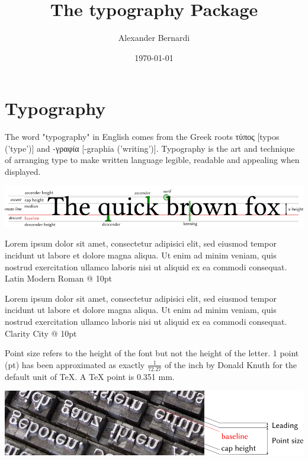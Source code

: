 \documentclass[a4paper,10pt]{scrarticle}
\title{\textnormal{The \textbf{typography} Package}}
\author{Alexander Bernardi}
\date{\today}
\newcommand{\loremipsum}{Lorem ipsum dolor sit amet, consectetur adipisici elit, sed eiusmod tempor incidunt ut labore et dolore magna aliqua. Ut enim ad minim veniam, quis nostrud exercitation ullamco laboris nisi ut aliquid ex ea commodi consequat.}
\begin{document}
\maketitle

\section{Typography}

The word "typography" in English comes from the Greek roots τύπος [typos ('type')] and -γραφία [-graphia ('writing')].
Typography is the art and technique of arranging type to make written language legible, readable and appealing when displayed.

\includegraphics[width=\linewidth]{img/Typography Lines Terms.png} 



\begin{minipage}[t]{0.48\linewidth}
{\fontsize{10}{12}\loremipsum\\ Latin Modern Roman @ 10pt}
\end{minipage}
\hfill
\begin{minipage}[t]{0.48\linewidth}
{\fontsize{10}{12}\loremipsum\\ Clarity City @ 10pt}
\end{minipage}

\noindent{} Point size refers to the height of the font but not the height of the letter.
1 point (pt) has been approximated as exactly $\frac{1}{72.27}$ of the inch by Donald Knuth for the default unit of \TeX. A TeX point is 0.351 mm.\par
\medskip
{\centering \includegraphics[width=\linewidth]{img/Typography leading.png} \par}
\medskip
\end{document}
